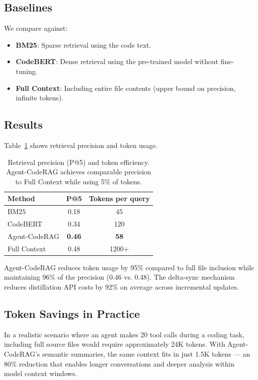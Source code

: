 \documentclass[10pt,twocolumn]{article}
\begin{document}
\subsection{Baselines}

We compare against:
\begin{itemize}
    \item \textbf{BM25}: Sparse retrieval using the code text.
    \item \textbf{CodeBERT}: Dense retrieval using the pre-trained model without fine-tuning.
    \item \textbf{Full Context}: Including entire file contents (upper bound on precision, infinite tokens).
\end{itemize}

\subsection{Results}

Table~\ref{tab:results} shows retrieval precision and token usage.

\begin{table}
    \centering
    \caption{Retrieval precision (P@5) and token efficiency. Agent-CodeRAG achieves comparable precision to Full Context while using 5\% of tokens.}
    \label{tab:results}
    \begin{tabular}{lcc}
        \toprule
        Method & P@5 & Tokens per query \\
        \midrule
        BM25 & 0.18 & 45 \\
        CodeBERT & 0.34 & 120 \\
        Agent-CodeRAG & \textbf{0.46} & \textbf{58} \\
        Full Context & 0.48 & 1200+ \\
        \bottomrule
    \end{tabular}
\end{table}

Agent-CodeRAG reduces token usage by 95\% compared to full file inclusion while maintaining 96\% of the precision (0.46 vs. 0.48). The delta-sync mechanism reduces distillation API costs by 92\% on average across incremental updates.

\subsection{Token Savings in Practice}

In a realistic scenario where an agent makes 20 tool calls during a coding task, including full source files would require approximately 24K tokens. With Agent-CodeRAG's semantic summaries, the same context fits in just 1.5K tokens — an 80\% reduction that enables longer conversations and deeper analysis within model context windows.
\end{document}
